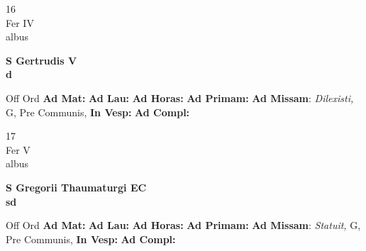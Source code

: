 \documentclass[10pt, openany]{book}
\begin{document}
        \begin{center}
            \begin{minipage}{3.5in}
                \vspace{2em}
                \begin{minipage}{0.5in}
                    {\Huge 16} \\
                    {\normalsize Fer IV} \\
                    {\normalsize albus}
                \end{minipage}
                \begin{minipage}{3.0in}
                    \textbf{ \large S Gertrudis V \\
                    \textnormal{\normalsize d}} \\ 
                \end{minipage}
                \begin{justify}Off Ord
                    \textbf{Ad Mat: }
                    \textbf{Ad Lau: }
                    \textbf{Ad Horas: }
                    \textbf{Ad Primam: }\textbf{Ad Missam}: \textit{Dilexisti,} G, Pre Communis,  
                    \textbf{In Vesp: }
                    \textbf{Ad Compl: }
                \end{justify}
            \end{minipage}
        \end{center}
    
        \begin{center}
            \begin{minipage}{3.5in}
                \vspace{2em}
                \begin{minipage}{0.5in}
                    {\Huge 17} \\
                    {\normalsize Fer V} \\
                    {\normalsize albus}
                \end{minipage}
                \begin{minipage}{3.0in}
                    \textbf{ \large S Gregorii Thaumaturgi EC \\
                    \textnormal{\normalsize sd}} \\ 
                \end{minipage}
                \begin{justify}Off Ord
                    \textbf{Ad Mat: }
                    \textbf{Ad Lau: }
                    \textbf{Ad Horas: }
                    \textbf{Ad Primam: }\textbf{Ad Missam}: \textit{Statuit,} G, Pre Communis,  
                    \textbf{In Vesp: }
                    \textbf{Ad Compl: }
                \end{justify}
            \end{minipage}
        \end{center}
    
\end{document}
